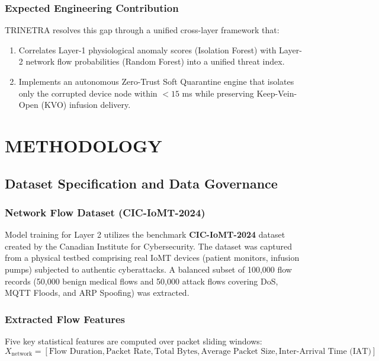 \documentclass[12pt,a4paper]{report}
\begin{document}
\subsection{Expected Engineering Contribution}
TRINETRA resolves this gap through a unified cross-layer framework that:
\begin{enumerate}
    \item Correlates Layer-1 physiological anomaly scores (Isolation Forest) with Layer-2 network flow probabilities (Random Forest) into a unified threat index.
    \item Implements an autonomous Zero-Trust Soft Quarantine engine that isolates only the corrupted device node within $<15$ ms while preserving Keep-Vein-Open (KVO) infusion delivery.
\end{enumerate}

\chapter{METHODOLOGY}

\section{Dataset Specification and Data Governance}
\subsection{Network Flow Dataset (CIC-IoMT-2024)}
Model training for Layer 2 utilizes the benchmark \textbf{CIC-IoMT-2024} dataset created by the Canadian Institute for Cybersecurity. The dataset was captured from a physical testbed comprising real IoMT devices (patient monitors, infusion pumps) subjected to authentic cyberattacks. A balanced subset of 100,000 flow records (50,000 benign medical flows and 50,000 attack flows covering DoS, MQTT Floods, and ARP Spoofing) was extracted.

\subsection{Extracted Flow Features}
Five key statistical features are computed over packet sliding windows:
\begin{equation}
    X_{\text{network}} = \left[ \text{Flow Duration}, \text{Packet Rate}, \text{Total Bytes}, \text{Average Packet Size}, \text{Inter-Arrival Time (IAT)} \right]
\end{equation}
\end{document}

